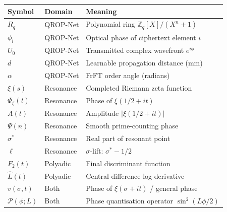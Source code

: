 \documentclass[11pt, a4paper]{article}
\theoremstyle{definition}
\theoremstyle{plain}
\newcommand{\Zq}{\mathbb{Z}_q}
\newcommand{\xif}{\xi}                      %
\newcommand{\Phiz}{\Phi_\xi}               %
\newcommand{\Ampl}{A}                       %
\newcommand{\Psip}{\Psi}                    %
\newcommand{\Lhat}{\hat{L}}                %
\begin{document}
\begin{center}
\small
\begin{tabular}{lll}
\toprule
\textbf{Symbol} & \textbf{Domain} & \textbf{Meaning} \\
\midrule
$R_q$ & QROP-Net & Polynomial ring $\Zq[X]/(X^n+1)$ \\
$\phi_i$ & QROP-Net & Optical phase of ciphertext element $i$ \\
$U_0$ & QROP-Net & Transmitted complex wavefront $e^{i\phi}$ \\
$d$ & QROP-Net & Learnable propagation distance (mm) \\
$\alpha$ & QROP-Net & FrFT order angle (radians) \\
$\xif(s)$ & Resonance & Completed Riemann zeta function \\
$\Phiz(t)$ & Resonance & Phase of $\xif(1/2+it)$ \\
$\Ampl(t)$ & Resonance & Amplitude $|\xif(1/2+it)|$ \\
$\Psip(n)$ & Resonance & Smooth prime-counting phase \\
$\sigma^*$ & Resonance & Real part of resonant point \\
$\ell$ & Resonance & $\sigma$-lift: $\sigma^* - 1/2$ \\
$F_2(t)$ & Polyadic & Final discriminant function \\
$\Lhat(t)$ & Polyadic & Central-difference log-derivative \\
$v(\sigma,t)$ & Both & Phase of $\xif(\sigma+it)$ / general phase \\
$\mathcal{P}(\phi;L)$ & Both & Phase quantisation operator $\sin^2(L\phi/2)$ \\
\bottomrule
\end{tabular}
\end{center}
\end{document}
